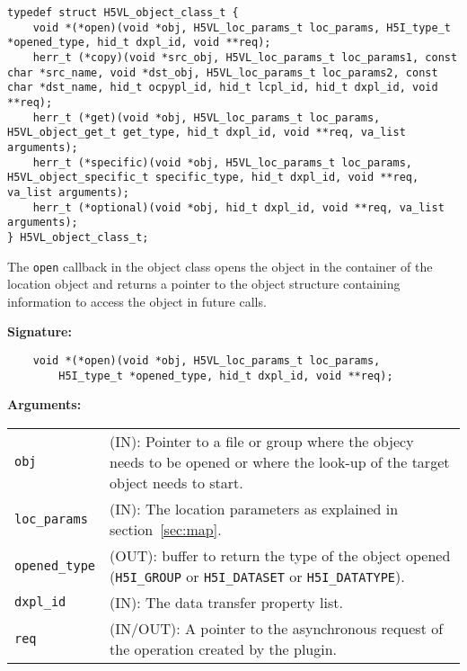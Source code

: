 \begin{lstlisting}[caption={Structure for object callback routines, H5VLpublic.h}, captionpos=b, label={lst:H5Oclass}]
typedef struct H5VL_object_class_t {
    void *(*open)(void *obj, H5VL_loc_params_t loc_params, H5I_type_t *opened_type, hid_t dxpl_id, void **req);
    herr_t (*copy)(void *src_obj, H5VL_loc_params_t loc_params1, const char *src_name, void *dst_obj, H5VL_loc_params_t loc_params2, const char *dst_name, hid_t ocpypl_id, hid_t lcpl_id, hid_t dxpl_id, void **req);
    herr_t (*get)(void *obj, H5VL_loc_params_t loc_params, H5VL_object_get_t get_type, hid_t dxpl_id, void **req, va_list arguments);
    herr_t (*specific)(void *obj, H5VL_loc_params_t loc_params, H5VL_object_specific_t specific_type, hid_t dxpl_id, void **req, va_list arguments);
    herr_t (*optional)(void *obj, hid_t dxpl_id, void **req, va_list arguments);
} H5VL_object_class_t;
\end{lstlisting}

The \texttt{open} callback in the object class opens the object in
the container of the location object and returns a pointer to the
object structure containing information to access the object in future
calls.\bigskip

\begin{mdframed}[style=bgbox]
\textbf{Signature:}
\begin{lstlisting}
    void *(*open)(void *obj, H5VL_loc_params_t loc_params, 
        H5I_type_t *opened_type, hid_t dxpl_id, void **req);
\end{lstlisting}

\textbf{Arguments:}\\
\begin{tabular}{l p{10cm}}
  \texttt{obj} & (IN): Pointer to a file or group where the objecy needs to be
  opened or where the look-up of the target object needs to start.\\
  \texttt{loc\_params} & (IN): The location parameters as explained in
  section~\ref{sec:map}.\\
  \texttt{opened\_type} & (OUT): buffer to return the type of the object
  opened (\texttt{H5I\_GROUP} or \texttt{H5I\_DATASET} or \texttt{H5I\_DATATYPE}).\\
  \texttt{dxpl\_id} & (IN): The data transfer property list.\\
  \texttt{req} & (IN/OUT): A pointer to the asynchronous request of the
  operation created by the plugin.\\
\end{tabular}
\end{mdframed}

